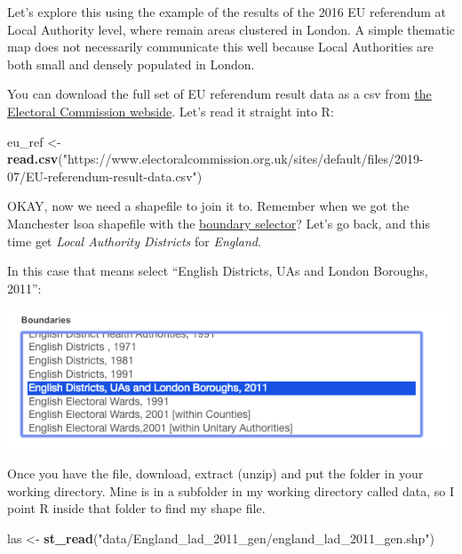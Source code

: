 \documentclass[]{book}
\newenvironment{Shaded}{\begin{snugshade}}{\end{snugshade}}
\newcommand{\KeywordTok}[1]{\textcolor[rgb]{0.13,0.29,0.53}{\textbf{#1}}}
\newcommand{\NormalTok}[1]{#1}
\newcommand{\StringTok}[1]{\textcolor[rgb]{0.31,0.60,0.02}{#1}}
\begin{document}
Let's explore this using the example of the results of the 2016 EU referendum at Local Authority level, where remain areas clustered in London. A simple thematic map does not necessarily communicate this well because Local Authorities are both small and densely populated in London.

You can download the full set of EU referendum result data as a csv from \href{https://www.electoralcommission.org.uk/find-information-by-subject/elections-and-referendums/past-elections-and-referendums/eu-referendum/eu-referendum-result-visualisations}{the Electoral Commission webside}. Let's read it straight into R:

\begin{Shaded}
\begin{Highlighting}[]
\NormalTok{eu_ref <-}\StringTok{ }\KeywordTok{read.csv}\NormalTok{(}\StringTok{"https://www.electoralcommission.org.uk/sites/default/files/2019-07/EU-referendum-result-data.csv"}\NormalTok{)}
\end{Highlighting}
\end{Shaded}

OKAY, now we need a shapefile to join it to. Remember when we got the Manchester lsoa shapefile with the \href{https://borders.ukdataservice.ac.uk/bds.html}{boundary selector}? Let's go back, and this time get \emph{Local Authority Districts} for \emph{England}.

In this case that means select ``English Districts, UAs and London Boroughs, 2011'':

\includegraphics{img/la_shp_dl.png}

Once you have the file, download, extract (unzip) and put the folder in your working directory. Mine is in a subfolder in my working directory called data, so I point R inside that folder to find my shape file.

\begin{Shaded}
\begin{Highlighting}[]
\NormalTok{las <-}\StringTok{ }\KeywordTok{st_read}\NormalTok{(}\StringTok{"data/England_lad_2011_gen/england_lad_2011_gen.shp"}\NormalTok{)}
\end{Highlighting}
\end{Shaded}
\end{document}
